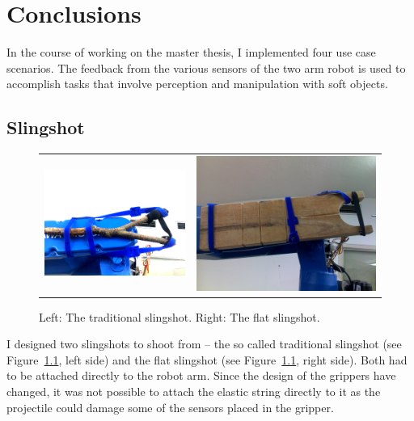 \chapter{Conclusions}
    In the course of working on the master thesis, I implemented four use case scenarios. The feedback from the various sensors of the two arm \CloPeMa\/ robot is used to accomplish tasks that involve perception and manipulation with soft objects.

    \section{Slingshot}

        \begin{figure}[h]
            \centering
            \begin{tabular}{cc}
            \includegraphics[height=0.3\textwidth]{Img/slingshot/attached_slingshotAdj.png}
            &
            \includegraphics[height=0.3\textwidth]{Img/slingshot/attached_flat_slingshot.png}
            \end{tabular}
            \caption{Left: The traditional slingshot. Right: The flat slingshot.}
            \label{fig:Slingshots}
        \end{figure}

        I designed two slingshots to shoot from -- the so called traditional slingshot (see Figure~\ref{fig:Slingshots}, left side) and the flat slingshot (see Figure~\ref{fig:Slingshots}, right side). Both had to be attached directly to the robot arm. Since the design of the grippers have changed, it was not possible to attach the elastic string directly to it as the projectile could damage some of the sensors placed in the gripper.

